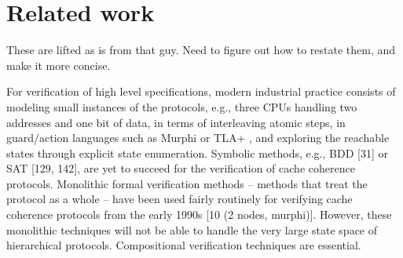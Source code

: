 \section{Related work}
\label{relatedWork}
These are lifted as is from that guy. Need to figure out how to restate them, and make it more concise.

For verification of high level specifications, modern industrial practice
consists of modeling small instances of the protocols, e.g., three CPUs
handling two addresses and one bit of data, in terms of interleaving atomic
steps, in guard/action languages such as Murphi \cite{tla} or TLA+ \cite{tla}, and
exploring the reachable states through explicit state enumeration.
Symbolic methods, e.g., BDD [31] or SAT [129, 142], are yet to succeed for the
verification of cache coherence protocols.
Monolithic formal verification methods – methods that treat the protocol as a whole – have
been used fairly routinely for verifying cache coherence protocols from the early 1990s
[10 (2 nodes, murphi)]. However, these monolithic techniques will not be able to handle the very
large state space of hierarchical protocols. Compositional verification techniques are essential. 


